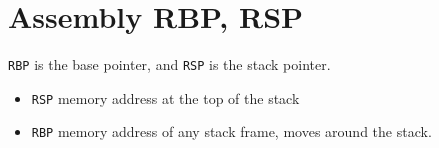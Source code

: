 \section{Assembly RBP, RSP}

\texttt{RBP} is the base pointer, and \texttt{RSP} is the stack pointer.

\begin{itemize}
\item \texttt{RSP} memory address at the top of the stack 
\item \texttt{RBP} memory address of any stack frame, moves around the stack.
\end{itemize}


